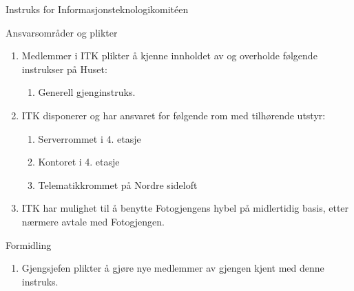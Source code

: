 \documentclass[../fsbok.tex]{subfiles}
\begin{document}
\begin{instruks*}{Instruks for Informasjonsteknologikomit\'een}
    \begin{instruksledd}{Ansvarsområder og plikter}
        \begin{enumerate}
            \item Medlemmer i ITK plikter å kjenne innholdet av og overholde følgende instrukser på Huset:
                \begin{enumerate}
                    \item  Generell gjenginstruks.
                \end{enumerate}
            \item ITK disponerer og har ansvaret for følgende rom med tilhørende utstyr:
                \begin{enumerate}
                    \item Serverrommet i 4. etasje
                    \item Kontoret i 4. etasje
                    \item Telematikkrommet på Nordre sideloft
                \end{enumerate}
            \item ITK har mulighet til å benytte Fotogjengens hybel på midlertidig basis, etter nærmere
                 avtale med Fotogjengen.
        \end{enumerate}
    \end{instruksledd}

    \begin{instruksledd}{Formidling}
        \begin{enumerate}
            \item Gjengsjefen plikter å gjøre nye medlemmer av gjengen kjent med denne
                instruks.
        \end{enumerate}
    \end{instruksledd}


\end{instruks*}
\end{document}
